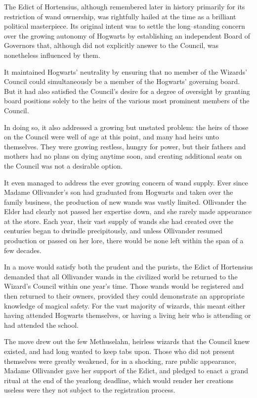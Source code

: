 The Edict of Hortensius, although remembered later in history primarily for its restriction of wand ownership, was rightfully hailed at the time as a brilliant political masterpiece. Its original intent was to settle the long\mbox{--}standing concern over the growing autonomy of Hogwarts by establishing an independent Board of Governors that, although did not explicitly answer to the Council, was nonetheless influenced by them.

It maintained Hogwarts’ neutrality by ensuring that no member of the Wizards’ Council could simultaneously be a member of the Hogwarts’ governing board. But it had also satisfied the Council’s desire for a degree of oversight by granting board positions solely to the heirs of the various most prominent members of the Council.

In doing so, it also addressed a growing but unstated problem: the heirs of those on the Council were well of age at this point, and many had heirs unto themselves. They were growing restless, hungry for power, but their fathers and mothers had no plans on dying anytime soon, and creating additional seats on the Council was not a desirable option.

It even managed to address the ever growing concern of wand supply. Ever since Madame Ollivander’s son had graduated from Hogwarts and taken over the family business, the production of new wands was vastly limited. Ollivander the Elder had clearly not passed her expertise down, and she rarely made appearance at the store. Each year, their vast supply of wands she had created over the centuries began to dwindle precipitously, and unless Ollivander resumed production or passed on her lore, there would be none left within the span of a few decades.

In a move would satisfy both the prudent and the purists, the Edict of Hortensius demanded that all Ollivander wands in the civilized world be returned to the Wizard’s Council within one year’s time. Those wands would be registered and then returned to their owners, provided they could demonstrate an appropriate knowledge of magical safety. For the vast majority of wizards, this meant either having attended Hogwarts themselves, or having a living heir who is attending or had attended the school.

The move drew out the few Methuselahn, heirless wizards that the Council knew existed, and had long wanted to keep tabs upon. Those who did not present themselves were greatly weakened, for in a shocking, rare public appearance, Madame Ollivander gave her support of the Edict, and pledged to enact a grand ritual at the end of the yearlong deadline, which would render her creations useless were they not subject to the registration process.


